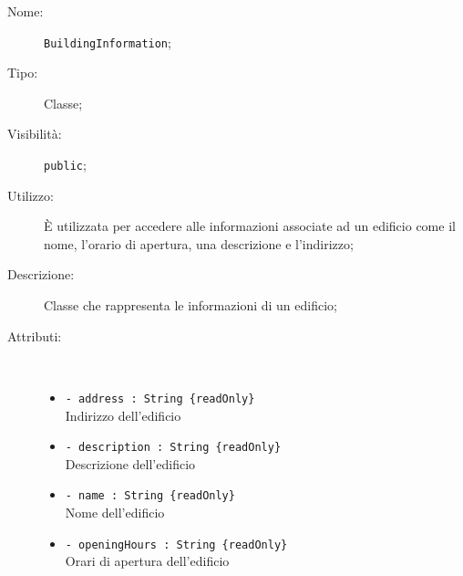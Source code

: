 \documentclass[../DefinizioneDiProdotto.tex]{subfiles}
\begin{document}
\begin{description}
	\item[Nome:] \texttt{BuildingInformation};
	\item[Tipo:] Classe;
	\item[Visibilità:] \texttt{public};
	\item[Utilizzo:] È utilizzata per accedere alle informazioni associate ad un edificio come il nome, l'orario di apertura, una descrizione e l'indirizzo;
	\item[Descrizione:] Classe che rappresenta le informazioni di un edificio;
	\item[Attributi:] \
	\begin{itemize}
		\item \texttt{- address : String  \{readOnly\}}\\
		Indirizzo dell'edificio
		
		\item \texttt{- description : String  \{readOnly\}}\\
		Descrizione dell'edificio
		
		\item \texttt{- name : String  \{readOnly\}}\\
		Nome dell'edificio
		
		\item \texttt{- openingHours : String  \{readOnly\}}\\
		Orari di apertura dell'edificio
		

\end{itemize}
\end{description}
\end{document}
